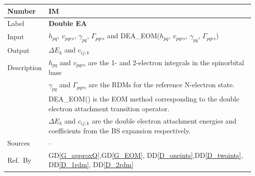 \documentclass[12pt]{article}
\newcommand{\colAwidth}{0.13\textwidth}
\newcommand{\colBwidth}{0.82\textwidth}
\newcommand{\dref}[1]{GD\ref{#1}}
\newcommand{\ddref}[1]{DD\ref{#1}}
\newcounter{instnum} %
\begin{document}

\noindent
\begin{minipage}{\textwidth}
	\renewcommand*{\arraystretch}{1.5}
	\begin{tabular}{| p{\colAwidth} | p{\colBwidth}|}
		\hline
		\rowcolor[gray]{0.9}
		Number& IM{instnum}\theinstnum \label{IM_DEA}\\
		\hline
		Label& \bf Double EA\\
		\hline
		Input&$h_{pq}$, $v_{pqrs}$, $\gamma_{pq}$, $\Gamma_{pqrs}$ and 
		DEA\_EOM($h_{pq}$, $v_{pqrs}$, $\gamma_{pq}$, $\Gamma_{pqrs}$)\\
		\hline
		Output&$\Delta E_k$ and $c_{ij;k}$\\
		\hline
		Description& $h_{pq} $ and $ v_{pqrs}$ are the 1- and 2-electron 
		integrals in the spinorbital base\\
		& $\gamma_{pq}$ and $\Gamma_{pqrs}$ are the RDMs for the reference 
		N-electron state.\\
		& DEA\_EOM() is the EOM method corresponding to the double electron 
		attachment transition operator.\\
		&$\Delta E_k$ and $c_{ij;k}$ are the double electron attachment 
		energies and coefficients from the BS expansion respectively.\\
		\hline
		Sources& -- \\
		\hline
		Ref.\ By & \dref{G_approxQ},\dref{G_EOM},  
		\ddref{D_oneints},\ddref{D_twoints}, \ddref{D_1rdm}, 
		\ddref{D_2rdm}\\
		\hline
	\end{tabular}
\end{minipage}\\

~\newline
\end{document}
